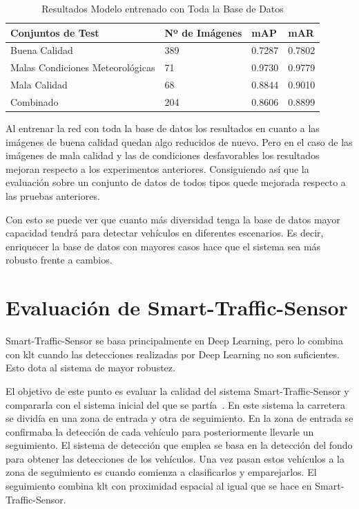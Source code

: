 \begin{table}[htbp]
\begin{center}
\begin{tabular}{|l|l|l|l|}
\hline
 Conjuntos de Test & Nº de Imágenes & mAP & mAR  \\ 
\hline \hline
Buena Calidad & 389 & 0.7287 & 0.7802 \\ \hline
Malas Condiciones Meteorológicas & 71 & 0.9730 & 0.9779 \\ \hline
Mala Calidad  & 68 & 0.8844 & 0.9010\\ \hline
Combinado & 204 & 0.8606 & 0.8899\\ \hline
\end{tabular}
\caption{Resultados Modelo entrenado con Toda la Base de Datos}
\label{resultados_test_todas_img}
\end{center}
\end{table}

Al entrenar la red con toda la base de datos los resultados en cuanto a las imágenes de buena calidad quedan algo reducidos de nuevo. Pero en el caso de las imágenes de mala calidad y las de condiciones desfavorables los resultados mejoran respecto  a los experimentos anteriores. Consiguiendo así que la evaluación sobre un conjunto de datos de todos tipos quede mejorada respecto a las pruebas anteriores. 

Con esto se puede ver que cuanto más diversidad tenga la base de datos mayor capacidad tendrá para detectar vehículos en diferentes escenarios. Es decir, enriquecer la base de datos con mayores casos hace que el sistema sea más robusto frente a cambios. 

\section{Evaluación de Smart-Traffic-Sensor}

Smart-Traffic-Sensor se basa principalmente en Deep Learning, pero lo combina con \acrshort{klt} cuando las detecciones realizadas por Deep Learning no son suficientes. Esto dota al sistema de mayor robustez. 

El objetivo de este punto es evaluar la calidad del sistema Smart-Traffic-Sensor y compararla con el sistema inicial del que se partía~\cite{redo_tesis}. En este sistema la carretera se dividía en una zona de entrada y otra de seguimiento. En la zona de entrada se confirmaba la detección de cada vehículo para posteriormente llevarle un seguimiento.  El sistema de detección que emplea se  basa en la detección del fondo para obtener las detecciones de los vehículos. Una vez pasan estos vehículos a la zona de seguimiento es cuando comienza a clasificarlos y emparejarlos. El seguimiento combina \acrshort{klt} con proximidad espacial al igual que se hace en Smart-Traffic-Sensor.

